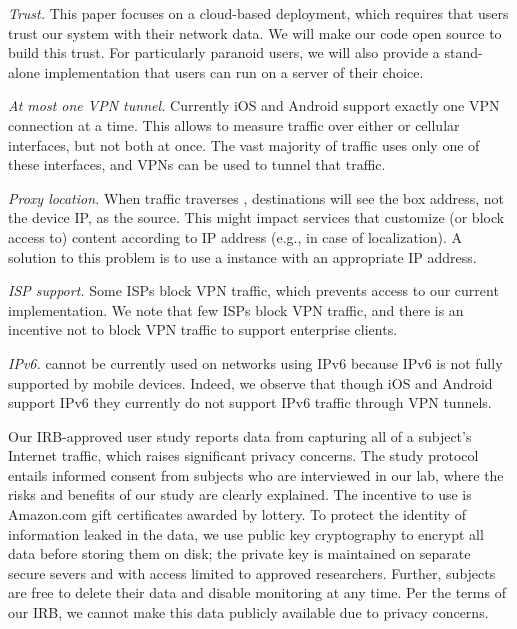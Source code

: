 \noindent\emph{Trust.} This paper focuses on a cloud-based \meddle deployment, which requires 
that users trust our system with their network data. We will make our code open source to build this 
trust. For particularly paranoid users, we will also provide a stand-alone implementation that users 
can run on a server of their choice.

\noindent\emph{At most one VPN tunnel.}
Currently iOS and Android support exactly one VPN connection at a time. 
This allows \meddle to measure traffic over either \wifi or cellular interfaces, but not both at once.
The vast majority of traffic uses only one of these interfaces, and VPNs can be used to tunnel that traffic.

\noindent\emph{Proxy location.} 
When traffic traverses \meddle, destinations will see the \meddle box address, not the device IP, as the source. 
This might impact services  that customize (or block access to) content according to IP address (e.g., in case of localization). 
A solution to this problem is to use a \meddle{} instance with an appropriate IP address.

\noindent\emph{ISP support.}
Some ISPs block VPN traffic, which prevents access to our current \meddle implementation. 
We note that few ISPs block VPN traffic, and there is an incentive not to block VPN traffic to 
support enterprise clients.

\noindent\emph{IPv6.}
\meddle{} cannot be currently used on networks using IPv6 because IPv6 is not fully supported by mobile devices. 
Indeed, we observe that though iOS and Android support IPv6 they currently do not support IPv6 traffic through VPN tunnels.


 Our IRB-approved user study reports data from capturing all of a 
subject's Internet traffic, which raises significant privacy concerns.  
The study protocol entails informed consent
from subjects who are interviewed in our lab, where the risks and
benefits of our study are clearly explained.  The incentive to use
\meddle is Amazon.com gift certificates awarded by lottery. To protect the
identity of information leaked in the data, we use public key
cryptography to encrypt all data before storing them 
on disk; the private key is
maintained on separate secure severs and with access limited to
approved researchers.  Further, subjects are free to delete their
data and disable monitoring at any time.  Per the terms of our IRB, we cannot 
make this data publicly available due to privacy concerns. 

